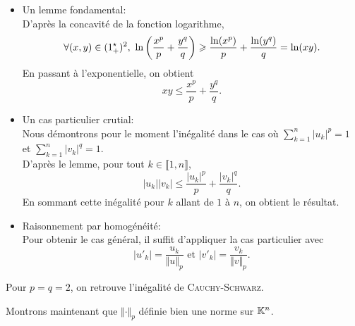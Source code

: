 %    

\begin{preuve}
    \begin{itemize}
        \item Un lemme fondamental: \\
        D'après la concavité de la fonction logarithme, 
        $$\forall (x, y) \in (1^\star_+)^2,\ \ln \left( \frac{x^p}{p} + \frac{y^q}{q} \right) \geqslant \frac{\ln(x^p)}{p} + \frac{\ln(y^q)}{q} = \ln(xy).$$
        En passant à l'exponentielle, on obtient
        $$xy \leqslant \frac{x^p}{p} + \frac{y^q}{q}.$$
        \item Un cas particulier crutial: \\
        Nous démontrons pour le moment l'inégalité dans le cas où $\sum\limits_{k=1}^n |u_k|^p = 1$ et $\sum\limits_{k=1}^n |v_k|^q = 1$. \\
        D'après le lemme, pour tout $k \in \llbracket 1, n \rrbracket$,
        $$|u_k| |v_k| \leqslant \frac{|u_k|^p}{p} + \frac{|v_k|^q}{q}.$$
        En sommant cette inégalité pour $k$ allant de $1$ à $n$, on obtient le résultat.
        \item Raisonnement par homogénéité: \\
        Pour obtenir le cas général, il suffit d'appliquer la cas particulier avec 
        $$|u'_k| = \frac{u_k}{\Vert u \Vert_p} \text{ et } |v'_k| = \frac{v_k}{\Vert v \Vert_p}.$$
    \end{itemize}
\end{preuve}

\begin{remarque}
    Pour $p = q = 2$, on retrouve l'inégalité de \textsc{Cauchy}-\textsc{Schwarz}.
\end{remarque}

Montrons maintenant que $\Vert \bm{\cdot} \Vert_p$ définie bien une norme sur $\mathbb{K}^n$.

